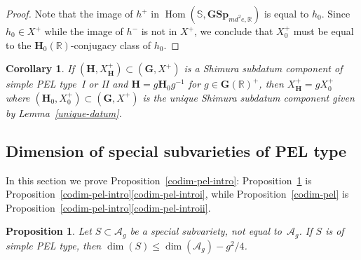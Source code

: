 \documentclass[JEP,XML,SOM,Unicode,NoFloatCountersInSection]{cedram}
\newcommand{\bR}{\mathbb{R}}
\newcommand{\Ag}{\mathcal{A}_g}
\newcommand{\gG}{\mathbf{G}}
\newcommand{\gGSp}{\mathbf{GSp}}
\newcommand{\gH}{\mathbf{H}}
\DeclareMathOperator{\Hom}{Hom}
\newtheorem{proposition}[lemma]{Proposition}
\newtheorem{corollary}[lemma]{Corollary}
\begin{document}
\begin{proof}
Note that the image of $h^+$ in $\Hom(\mathbb{S},\gGSp_{md^2e,\bR})$ is equal to $h_0$.
Since $h_0 \in X^+$ while the image of $h^-$ is not in $X^+$, we conclude that $X_0^+$ must be equal to the $\gH_0(\bR)$-conjugacy class of $h_0$.
\end{proof}

\begin{corollary} \label{conj-class-datum}
If $(\gH, X_\gH^+) \subset (\gG, X^+)$ is a Shimura subdatum component of simple PEL type~I or II and $\gH = g\gH_0 g^{-1}$ for $g \in \gG(\bR)^+$, then $X_\gH^+ = gX_0^+$ where $(\gH_0, X_0^+) \subset (\gG, X^+)$ is the unique Shimura subdatum component given by Lemma~\ref{unique-datum}.
\end{corollary}

\subsection{Dimension of special subvarieties of PEL type}\label{sec:dims}

In this section we prove Proposition~\ref{codim-pel-intro}: Proposition~\ref{codim-pel-simple} is Proposition~\ref{codim-pel-intro}\eqref{codim-pel-introi}, while Proposition~\ref{codim-pel} is Proposition~\ref{codim-pel-intro}\eqref{codim-pel-introii}.

\begin{proposition}\label{codim-pel-simple}
Let $S \subset \Ag$ be a special subvariety, not equal to~$\Ag$.
If $S$ is of simple PEL type, then $\dim(S) \leq \dim(\Ag) - g^2/4$.
\end{proposition}
\end{document}
